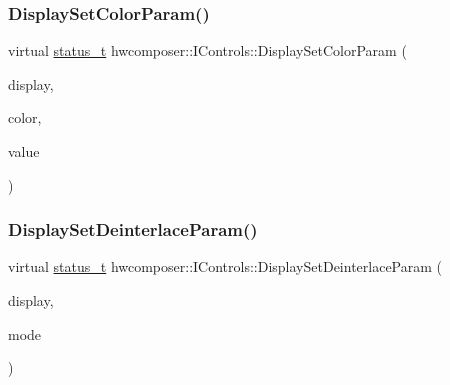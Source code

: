 \mbox{\label{classhwcomposer_1_1IControls_a85a46964e57700804a3e6f6289f8046f}} 
\subsubsection{\texorpdfstring{Display\+Set\+Color\+Param()}{DisplaySetColorParam()}}
{\footnotesize\ttfamily virtual \mbox{\hyperlink{hwcserviceapi_8h_a3806fb2027d9a316d8ca8d9b8b8eb96f}{status\+\_\+t}} hwcomposer\+::\+I\+Controls\+::\+Display\+Set\+Color\+Param (\begin{DoxyParamCaption}\item[{uint32\+\_\+t}]{display,  }\item[{\mbox{\hyperlink{hwcserviceapi_8h_a1d1cbf448ce748672cf3dd96675d70e4}{E\+Hwcs\+Color\+Control}}}]{color,  }\item[{float}]{value }\end{DoxyParamCaption})\hspace{0.3cm}{\ttfamily [pure virtual]}}

\mbox{\label{classhwcomposer_1_1IControls_ac1e0de62aefa375f4f6dfd565046ba1d}} 
\subsubsection{\texorpdfstring{Display\+Set\+Deinterlace\+Param()}{DisplaySetDeinterlaceParam()}}
{\footnotesize\ttfamily virtual \mbox{\hyperlink{hwcserviceapi_8h_a3806fb2027d9a316d8ca8d9b8b8eb96f}{status\+\_\+t}} hwcomposer\+::\+I\+Controls\+::\+Display\+Set\+Deinterlace\+Param (\begin{DoxyParamCaption}\item[{uint32\+\_\+t}]{display,  }\item[{\mbox{\hyperlink{hwcserviceapi_8h_a8473f2ec9e7333e67be46a1bea689113}{E\+Hwcs\+Deinterlace\+Control}}}]{mode }\end{DoxyParamCaption})\hspace{0.3cm}{\ttfamily [pure virtual]}}

